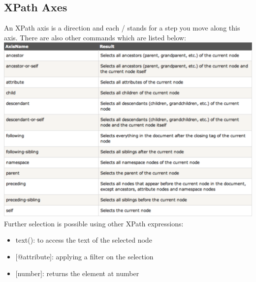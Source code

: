 \subsection{XPath Axes}
An XPath axis is a direction and each / stands for a step you move along this axis. There are also other commands which are listed below:\\
\includegraphics[width=\textwidth]{fig/XPathAxes.png}
Further selection is possible using other XPath expressions:
\begin{itemize}
	\item text(): to access the text of the selected node
	\item $\lbrack$@attribute$\rbrack$: applying a filter on the selection
	\item $\lbrack$number$\rbrack$: returns the element at number
\end{itemize}

